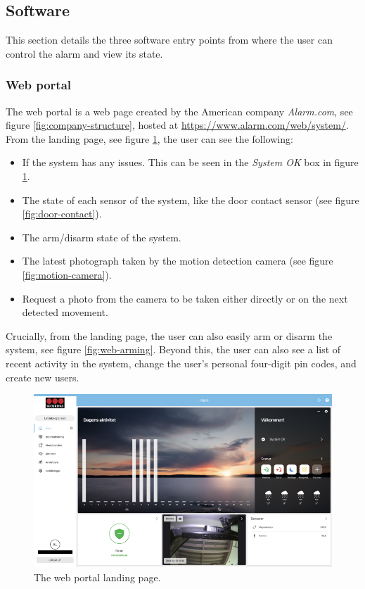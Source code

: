\subsection{Software} \label{ch:system:software}
This section details the three software entry points from where the user can control the alarm and view its state.

\subsubsection{Web portal}
The web portal is a web page created by the American company \textit{Alarm.com}, see figure \ref{fig:company-structure}, hosted at \url{https://www.alarm.com/web/system/}. From the landing page, see figure \ref{fig:web-landing-page}, the user can see the following:
\begin{itemize}
    \item If the system has any issues. This can be seen in the \textit{System OK} box in figure \ref{fig:web-landing-page}.
    \item The state of each sensor of the system, like the door contact sensor (see figure \ref{fig:door-contact}).
    \item The arm/disarm state of the system.
    \item The latest photograph taken by the motion detection camera (see figure \ref{fig:motion-camera}).
    \item Request a photo from the camera to be taken either directly or on the next detected movement.
\end{itemize}
Crucially, from the landing page, the user can also easily arm or disarm the system, see figure \ref{fig:web-arming}. Beyond this, the user can also see a list of recent activity in the system, change the user's personal four-digit pin codes, and create new users.
\begin{figure}[!ht]
    \centering
    \includegraphics[width=\textwidth]{images/3-system/landing-page-web.png}
    \caption{The web portal landing page.}
    \label{fig:web-landing-page}
\end{figure}
